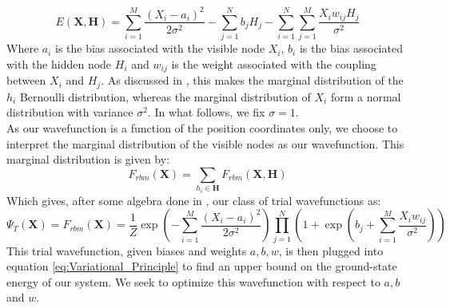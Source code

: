 \documentclass[a4paper, 10pt]{article}
\begin{document}
	\begin{equation}
	E(\mathbf{X}, \mathbf{H})=\sum_{i=1}^{M}\frac{\left(X_i-a_i\right)^2}{2\sigma^2}-\sum_{j=1}^N b_j H_j -\sum_{i=1}^{N}\sum_{j=1}^{M}\frac{X_iw_{ij}H_j}{\sigma^2}
	\end{equation}
	Where $a_i$ is the bias associated with the visible node $X_i$, $b_i$ is the bias associated with the hidden node $H_i$ and $w_{ij}$ is the weight associated with the coupling between $X_i$ and $H_j$. As discussed in \cite{Wang2014}, this makes the marginal distribution of the $h_i$ Bernoulli distribution, whereas the marginal distribution of $X_i$ form a normal distribution with variance $\sigma^2$. In what follows, we fix $\sigma=1$.\\
	\linebreak
	As our wavefunction is a function of the position coordinates only, we choose to interpret the marginal distribution of the visible nodes as our wavefunction. This marginal distribution is given by:
	\begin{equation}
	F_{rbm}(\mathbf{X})=\sum_{h_i \in \mathbf{H}}F_{rbm}(\mathbf{X}, \mathbf{H})
	\end{equation}
	Which gives, after some algebra done in \cite{Hjorth-Jensen2018}, our class of trial wavefunctions as:
	\begin{equation}\label{eq:Wavefunction}
	\Psi_T(\mathbf{X})=F_{rbm}(\mathbf{X})=\frac{1}{Z}\exp \left(-\sum_{i=1}^M \frac{(X_i-a_i)^2}{2\sigma^2}\right)\prod_{j=1}^{N}\left(1+\exp\left(b_j+\sum_{i=1}^M \frac{X_iw_{ij}}{\sigma^2} \right)\right)
	\end{equation}
	This trial wavefunction, given biases and weights $a,b,w$, is then plugged into equation \ref{eq:Variational_Principle} to find an upper bound on the ground-state energy of our system. We seek to optimize this wavefunction with respect to $a,b$ and $w$.
\end{document}
